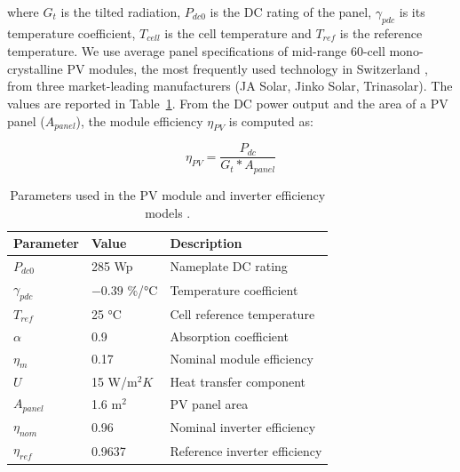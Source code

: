 where $G_t$ is the tilted radiation, $P_{dc0}$ is the DC rating of the panel,  $\gamma_\mathit{pdc}$ is its temperature coefficient, $T_\mathit{cell}$ is the cell temperature and $T_\mathit{ref}$ is the reference temperature.
%
We use average panel specifications of mid-range 60-cell mono-crystalline PV modules, the most frequently used technology in Switzerland \cite{buffat_scalable_2018}, from three market-leading manufacturers (JA Solar, Jinko Solar, Trinasolar). The values are reported in Table~\ref{tab:efficiency}.
%
From the DC power output and the area of a PV panel ($A_\mathit{panel}$), the module efficiency $\eta_{PV}$ is computed as:

\begin{equation}
\label{eq:eff}
    \eta_{PV} = \frac{P_{dc}}{G_{t} * A_\mathit{panel} }
\end{equation}

\begin{table}[tb]
\centering
\footnotesize
\caption{Parameters used in the PV module and inverter efficiency models \cite{dobos_pvwatts_2014, faiman_assessing_2008}.}
\label{tab:efficiency}

    \begin{tabular}{lll}
    \hline
    \textbf{Parameter} & \textbf{Value}     & \textbf{Description}          \\ \hline
    $P_{dc0}$          & 285 Wp           & Nameplate DC rating           \\
    $\gamma_{pdc}$     & $-0.39$ \%/°C& Temperature coefficient       \\
    $T_{ref}$          & 25 °C       & Cell reference temperature    \\
    $\alpha$           & 0.9                & Absorption coefficient        \\
    $\eta_m$           & 0.17               & Nominal module efficiency     \\
    $U$                & 15 W/m$^2K$        & Heat transfer component       \\
    $A_\mathit{panel}$        & 1.6 m$^2$          & PV panel area                 \\
    $\eta_\mathit{nom}$       & 0.96               & Nominal inverter efficiency   \\
    $\eta_\mathit{ref}$       & 0.9637             & Reference inverter efficiency \\ \hline
    \end{tabular}
\end{table}

